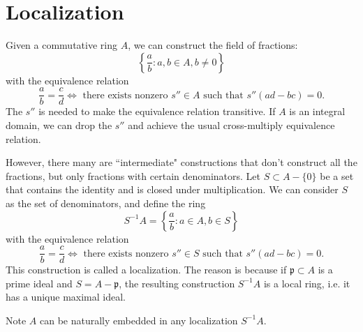 \section{Localization}
Given a commutative ring $A$, we can construct the field of fractions:
\[
    \left\{ \frac{a}{b} : a, b \in A, b \neq 0\right\}
\]
with the equivalence relation
\[
    \frac{a}{b} = \frac{c}{d} \iff \text{ there exists nonzero $s'' \in A$ such that } s''(ad - bc) = 0.
\]
The $s''$ is needed to make the equivalence relation transitive. If $A$ is an integral domain, we can drop the $s''$ and achieve the usual cross-multiply equivalence relation.

However, there many are ``intermediate" constructions that don't construct all the fractions, but only fractions with certain denominators. Let $S \subset A - \{0\}$ be a set that contains the identity and is closed under multiplication. We can consider $S$ as the set of denominators, and define the ring
\[
    S^{-1}A = \left\{ \frac{a}{b} : a \in A, b \in S \right\}
\]
with the equivalence relation
\[
    \frac{a}{b} = \frac{c}{d} \iff \text{ there exists nonzero $s'' \in S$ such that } s''(ad - bc) = 0.
\]
This construction is called a localization. The reason is because if $\mathfrak p \subset A$ is a prime ideal and $S = A - \mathfrak p$, the resulting construction $S^{-1}A$ is a local ring, i.e. it has a unique maximal ideal.

Note $A$ can be naturally embedded in any localization $S^{-1}A$.
